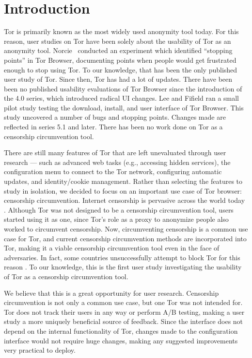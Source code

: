 \documentclass{template}
\begin{document}
\section{Introduction}
Tor is primarily known as the most widely used anonymity tool today. 
For this reason, user studies on Tor have been solely about the usability of Tor as an
anonymity tool. Norcie~\cite{norcie2012eliminating} conducted an experiment which identified 
``stopping points'' in Tor Browser, documenting points when people would get frustrated enough
to stop using Tor. To our knowledge, that has been the only published user study of Tor. 
Since then, Tor has had a lot of updates. There have been been no published usability evaluations of
Tor Browser since the introduction of the 4.0 series, which introduced radical UI changes. 
Lee and Fifield \cite {uxsprint} ran a small pilot study testing the download, install, and user interface of Tor Browser. 
This study uncovered a number of bugs and stopping points. Changes made are reflected in series 
5.1 and later. There has been no work done on Tor as a censorship circumvention tool. 

There are still many features of Tor that are left unevaluated through user
research --- such as advanced web tasks (e.g., accessing hidden services), the
configuration menu to connect to the Tor network, configuring automatic
updates, and identity/cookie management. Rather than selecting the features to
study in isolation, we decided to focus on an important use case of Tor browser: censorship circumvention. 
Internet censorship is pervasive across the world today \cite{faris2008measuring}. 
Although Tor was not designed to be a censorship circumvention tool, users started
using it as one, since Tor's role as a proxy to anonymize
people also worked to circumvent censorship. Now, circumventing censorship is a
common use case for Tor, and current censorship circumvention methods are
incorporated into Tor, making it a viable censorship circumvention tool even in the face
of adversaries. In fact, some countries unsuccessfully attempt to block Tor for this reason \cite{winter2012great}. 
To our knowledge, this is the first user study investigating the usability of Tor as a 
censorship circumvention tool.

We believe that this is a great opportunity for user research. Censorship circumvention
is not only a common use case, but one Tor was not intended for. Tor does not
track their users in any way or perform A/B testing, making a user study a more
uniquely beneficial source of feedback. Since the interface does not depend on the 
internal functionality of Tor, changes made to the configuration interface would not
require huge changes, making any suggested improvements very practical to 
deploy. 
\end{document}
